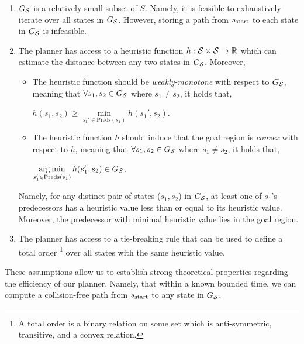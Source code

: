 \documentclass[a4paper,10pt]{article}
\begin{document}
\begin{enumerate}[label={\textbf{A\arabic*}}]
  \item \label{assum:1} $G_\mathcal{S}$ is a relatively small subset of $S$. Namely, it is feasible to exhaustively iterate over all states in $G_\mathcal{S}$.
However, storing a path from $s_{\textrm{start}}$ to each state in $G_\mathcal{S}$ is infeasible.
  
  \item \label{assum:2} The planner has access to a heuristic function $h: \mathcal{S} \times \mathcal{S} \rightarrow \mathbb{R}$ which can estimate the distance between any two states in $G_\mathcal{S}$. Moreover, 
 \begin{itemize}
  \item The heuristic function should be \textit{weakly-monotone} with respect to $G_\mathcal{S}$, meaning that $\forall s_1, s_2  \in G_\mathcal{S}$ where $s_1 \neq s_2 $, it holds that,
  \begin{center}
    $h(s_1, s_2) \geq \min\limits_{s_1' \in \text{Preds}(s_1)} h(s_1', s_2)$.
  \end{center}

  \item The heuristic function $h$ should induce that the goal region is \emph{convex} with respect to $h$, meaning that $\forall s_1, s_2  \in G_\mathcal{S}$ where $s_1 \neq s_2 $, it holds that,
  \begin{center}
     $\operatorname*{arg\,min}\limits_{s_1' \in \text{Preds}(s_1)} h(s_1', s_2) \in G_\mathcal{S}$.
  \end{center}

 \end{itemize}
 Namely, for any distinct pair of states ($s_1, s_2$) in $G_\mathcal{S}$, at least one of $s_1$'s predecessors has a heuristic value less than or equal to its heuristic value.
 Moreover, the predecessor with minimal heuristic value lies in the goal region.


  \item \label{assum:3} The planner has access to a tie-breaking rule that can be used to define a total order \footnote{A total order is a binary relation on some set which is anti-symmetric, transitive, and a convex relation.} over all states with the same heuristic value.
  \end{enumerate}

These assumptions allow us to establish strong theoretical properties regarding the efficiency of our planner. Namely, that
within a known bounded time, we can compute a collision-free path from $s_{\textrm{start}}$ to any state in $G_\mathcal{S}$. 
\end{document}
